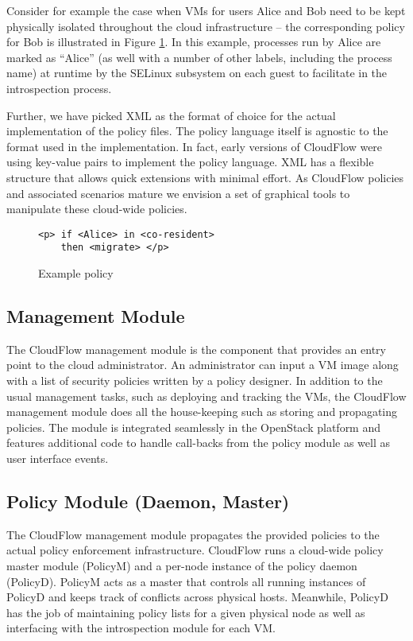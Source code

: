 Consider for example
the case when VMs for users Alice and Bob need to be kept physically isolated
throughout the cloud infrastructure -- the corresponding policy for Bob is
illustrated in Figure \ref{cloudflow:figure:examplepolicy}. 
In this example, processes run by Alice are
marked as ``Alice'' (as well with a number of other labels, including the process
name) at runtime by the SELinux subsystem on each guest to facilitate in the introspection process.

Further, we have picked XML as the format of choice for the actual
implementation of the policy files.  The policy language itself
is agnostic to the format used in the implementation.  In fact, early versions of CloudFlow were using key-value pairs to implement the policy language.  XML has a flexible structure
that allows quick extensions with minimal effort. As CloudFlow policies
and associated scenarios mature we envision a set of graphical tools to
manipulate these cloud-wide policies. 

\begin{figure}[h]
\begin{Verbatim}[frame=single]
<p> if <Alice> in <co-resident>
    then <migrate> </p>
\end{Verbatim}
\vspace{-10pt}
\caption{Example policy
\label{cloudflow:figure:examplepolicy}}
\end{figure}
\vspace{10pt}

\subsection{Management Module}

The CloudFlow management module is the component that provides an entry
point to the cloud administrator.  An administrator can input a VM image
along with a list of security policies written by a policy designer.  In addition to the usual management tasks,
such as deploying and tracking the VMs, the CloudFlow management module does all the
house-keeping such as storing and propagating
policies.  The module is integrated seamlessly in the OpenStack
platform \cite{OpenStack} and features additional code to handle call-backs from the
policy module as well as user interface events.

\subsection{Policy Module (Daemon, Master)}
% 
The CloudFlow management module propagates the provided policies to the
actual policy enforcement infrastructure.  CloudFlow runs a cloud-wide
policy master module (PolicyM) and a per-node instance of the policy daemon
(PolicyD).  PolicyM acts as a master that controls all running instances of
PolicyD and keeps track of conflicts across physical hosts.  Meanwhile,
PolicyD has the job of maintaining policy lists for a given physical node as
well as interfacing with the introspection module for each VM.

